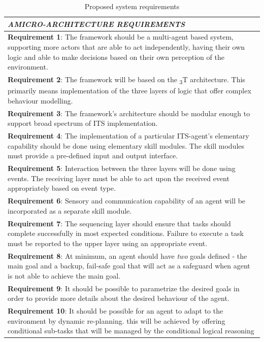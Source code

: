 \documentclass[main.tex]{subfiles}
\begin{document}
\begin{table}[htbp]
    \caption{Proposed system requirements}
    \centering\begin{tabular}{>{\footnotesize}p{}}
        \toprule 
\emph{\textbf{A}\quad MICRO-ARCHITECTURE REQUIREMENTS}\\ \midrule
\textbf{Requirement 1}: The framework should be a multi-agent based system, supporting more actors 
that are able to act independently, having their own logic and able to make decisions based on their 
own perception of the environment.
\\ \midrule
\textbf{Requirement 2}: The framework will be based on the \textsubscript{3}T architecture. 
This primarily means implementation of the three layers of logic that offer complex behaviour 
modelling.
\\ \midrule
\textbf{Requirement 3}: The framework's architecture should be modular enough to support broad 
spectrum of ITS implementation.
\\ \midrule
\textbf{Requirement 4}: The implementation of a particular ITS-agent's elementary
capability should be done using elementary skill modules. The skill modules must provide a
pre-defined input and output interface.
 \\ \midrule
\textbf{Requirement 5}: Interaction between the three layers will be done using events. The 
receiving layer must be able to act upon the received event appropriately based on event type.
 \\ \midrule
\textbf{Requirement 6}: Sensory and communication capability of an agent will be incorporated 
as a separate skill module.
\\ \midrule
\textbf{Requirement 7}: The sequencing layer should ensure that tasks should complete successfully 
in most expected conditions. Failure to execute a task must be reported to the upper layer using an 
appropriate event.
\\ \midrule
\textbf{Requirement 8}: At minimum, an agent should have \emph{two} goals defined - the main goal
and a backup, fail-safe goal that will act as a safeguard when agent is not able to achieve the main 
goal. \\ \midrule
\textbf{Requirement 9}: It should be possible to parametrize the desired goals in order to provide 
more details about the desired behaviour of the agent.
\\ \midrule 
\textbf{Requirement 10}: It should be possible for an agent to adapt to the environment by dynamic re-planning.
this will be achieved by offering conditional sub-tasks that will be managed by the conditional logical reasoning 

\end{tabular}
\end{table}
\end{document}
